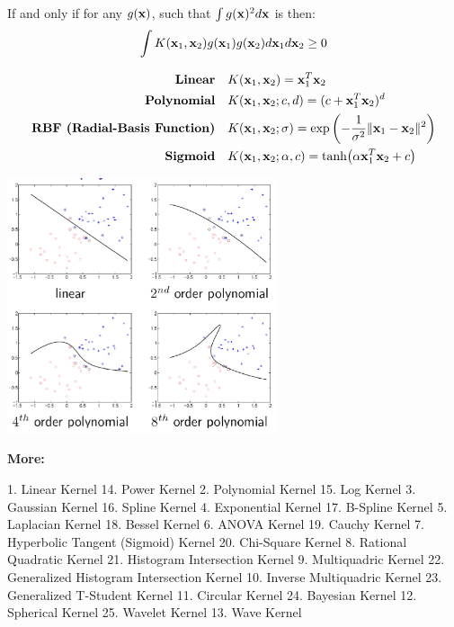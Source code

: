 \documentclass{tron}
\begin{document}
\begin{definition}{}
\begin{theorem}[Kernel]{}
		If and only if for any $g(\mathbf{x})$, such that $\int g(\mathbf{x})^2 d\mathbf{x}$ is  then:
		\begin{equation}
			\int K(\mathbf{x}_1, \mathbf{x}_2) g(\mathbf{x}_1) g(\mathbf{x}_2) d\mathbf{x}_1 d\mathbf{x}_2 \geq 0
		\end{equation}
	\end{theorem}
	
	\begin{example}{}
		\begin{align}
			\textbf{Linear} \quad & K(\mathbf{x}_1, \mathbf{x}_2) = \mathbf{x}_1^T \mathbf{x}_2 \\
			\textbf{Polynomial} \quad & K(\mathbf{x}_1, \mathbf{x}_2; c, d) = (c + \mathbf{x}_1^T \mathbf{x}_2)^d \\
			\textbf{RBF (Radial-Basis Function)} \quad & K(\mathbf{x}_1, \mathbf{x}_2; \sigma) = \exp\left(- \frac1{\sigma^2} \|\mathbf{x}_1 - \mathbf{x}_2\|^2 \right) \\
			\textbf{Sigmoid} \quad & K(\mathbf{x}_1, \mathbf{x}_2; \alpha, c) = \tanh (\alpha \mathbf{x}_1^T \mathbf{x}_2 + c)
		\end{align}
				
		\begin{center}
		\includegraphics[width=300px]{Figs/slide8/svm-kernel-ex}
		\end{center}

		\textbf{More:}
				
		1. Linear Kernel
		14. Power Kernel
		2. Polynomial Kernel
		15. Log Kernel
		3. Gaussian Kernel
		16. Spline Kernel
		4. Exponential Kernel
		17. B-Spline Kernel
		5. Laplacian Kernel
		18. Bessel Kernel
		6. ANOVA Kernel
		19. Cauchy Kernel
		7. Hyperbolic Tangent (Sigmoid) Kernel
		20. Chi-Square Kernel
		8. Rational Quadratic Kernel
		21. Histogram Intersection Kernel
		9. Multiquadric Kernel
		22. Generalized Histogram Intersection Kernel
		10. Inverse Multiquadric Kernel
		23. Generalized T-Student Kernel
		11. Circular Kernel
		24. Bayesian Kernel
		12. Spherical Kernel
		25. Wavelet Kernel
		13. Wave Kernel


\end{example}
\end{definition}
\end{document}
